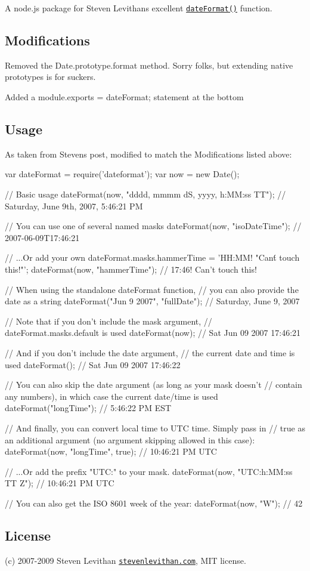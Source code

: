 A node.\+js package for Steven Levithan\textquotesingle{}s excellent \href{http://blog.stevenlevithan.com/archives/date-time-format}{\tt date\+Format()} function.

\subsection*{Modifications}


\begin{DoxyItemize}
\item Removed the {\ttfamily Date.\+prototype.\+format} method. Sorry folks, but extending native prototypes is for suckers.
\item Added a {\ttfamily module.\+exports = date\+Format;} statement at the bottom
\end{DoxyItemize}

\subsection*{Usage}

As taken from Steven\textquotesingle{}s post, modified to match the Modifications listed above\+: \begin{DoxyVerb}var dateFormat = require('dateformat');
var now = new Date();

// Basic usage
dateFormat(now, "dddd, mmmm dS, yyyy, h:MM:ss TT");
// Saturday, June 9th, 2007, 5:46:21 PM

// You can use one of several named masks
dateFormat(now, "isoDateTime");
// 2007-06-09T17:46:21

// ...Or add your own
dateFormat.masks.hammerTime = 'HH:MM! "Can\'t touch this!"';
dateFormat(now, "hammerTime");
// 17:46! Can't touch this!

// When using the standalone dateFormat function,
// you can also provide the date as a string
dateFormat("Jun 9 2007", "fullDate");
// Saturday, June 9, 2007

// Note that if you don't include the mask argument,
// dateFormat.masks.default is used
dateFormat(now);
// Sat Jun 09 2007 17:46:21

// And if you don't include the date argument,
// the current date and time is used
dateFormat();
// Sat Jun 09 2007 17:46:22

// You can also skip the date argument (as long as your mask doesn't
// contain any numbers), in which case the current date/time is used
dateFormat("longTime");
// 5:46:22 PM EST

// And finally, you can convert local time to UTC time. Simply pass in
// true as an additional argument (no argument skipping allowed in this case):
dateFormat(now, "longTime", true);
// 10:46:21 PM UTC

// ...Or add the prefix "UTC:" to your mask.
dateFormat(now, "UTC:h:MM:ss TT Z");
// 10:46:21 PM UTC

// You can also get the ISO 8601 week of the year:
dateFormat(now, "W");
// 42
\end{DoxyVerb}
 \subsection*{License}

(c) 2007-\/2009 Steven Levithan \href{http://stevenlevithan.com/}{\tt stevenlevithan.\+com}, M\+I\+T license. 